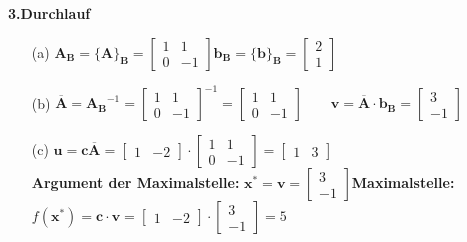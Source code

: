 \vspace{0.5cm}
\textbf{3.Durchlauf}
\begin{itemize}
	\item[(a)] $\mathbf{A_B}=\{\mathbf{A}\}_{\mathbf{B}}=\begin{bmatrix}1&1\\0&-1\end{bmatrix}$\qquad $\mathbf{b}_\mathbf{B}=\{\mathbf{b}\}_{\mathbf{B}}=\begin{bmatrix}2\\1\end{bmatrix}$
	\item[(b)] $\overline{\mathbf{A}}=\mathbf{A_B}^{-1}=\begin{bmatrix}1&1\\0&-1\end{bmatrix}^{-1}=\begin{bmatrix}1&1\\0&-1\end{bmatrix}\qquad
	\mathbf{v}=\mathbf{\overline{A}}\cdot\mathbf{b_B}=\begin{bmatrix}3\\-1\end{bmatrix}$
	\item[(c)] $\mathbf{u}=\mathbf{c\overline{A}}=\begin{bmatrix}1&-2\end{bmatrix}\cdot\begin{bmatrix}1&1\\0&-1\end{bmatrix}=\begin{bmatrix}1&3\end{bmatrix}$\\
	\textbf{Argument der Maximalstelle:} $\mathbf{x^*}=\mathbf{v}=\begin{bmatrix}3\\-1\end{bmatrix}$\qquad \textbf{Maximalstelle:} $f(\mathbf{x^*})=\mathbf{c}\cdot\mathbf{v}=\begin{bmatrix}1&-2\end{bmatrix}\cdot \begin{bmatrix}3\\-1\end{bmatrix}=5$
\end{itemize}






